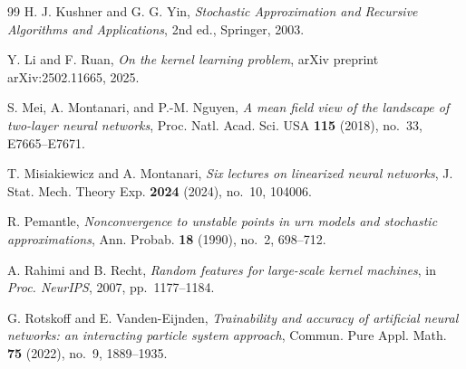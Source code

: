 \documentclass[a4paper]{article}
\theoremstyle{definition}
\newcommand{\1}{\mathbbm{1}}
\begin{document}
\begin{thebibliography}{99}
		 H. J. Kushner and G. G. Yin, \textit{Stochastic Approximation and Recursive Algorithms and Applications}, 2nd ed., Springer, 2003.
		
		
		 Y. Li and F. Ruan, \textit{On the kernel learning problem}, arXiv preprint arXiv:2502.11665, 2025.
		
		
		 S. Mei, A. Montanari, and P.-M. Nguyen, \textit{A mean field view of the landscape of two-layer neural networks}, Proc. Natl. Acad. Sci. USA \textbf{115} (2018), no.~33, E7665--E7671.
		
		 T. Misiakiewicz and A. Montanari, \textit{Six lectures on linearized neural networks}, J. Stat. Mech. Theory Exp. \textbf{2024} (2024), no.~10, 104006.
		
		 R. Pemantle, \textit{Nonconvergence to unstable points in urn models and stochastic approximations}, Ann. Probab. \textbf{18} (1990), no.~2, 698--712.
		
		
		 A. Rahimi and B. Recht, \textit{Random features for large-scale kernel machines}, in \textit{Proc. NeurIPS}, 2007, pp.~1177--1184.
		
		
		 G. Rotskoff and E. Vanden-Eijnden, \textit{Trainability and accuracy of artificial neural networks: an interacting particle system approach}, Commun. Pure Appl. Math. \textbf{75} (2022), no.~9, 1889--1935.
		
		
		
		
	\end{thebibliography}
	
	
	
	
	
	
\end{document}
